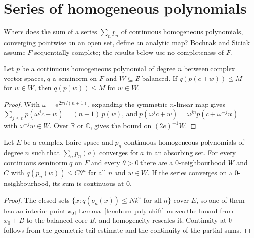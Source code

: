 \section{Series of homogeneous polynomials}

Where does the sum of a series $\sum_n p_n$ of continuous homogeneous polynomials, converging
pointwise on an open set, define an analytic map? Bochnak and Siciak \cite[\S5]{BS71b} assume
$F$ sequentially complete; the results below use no completeness of $F$.

\begin{lemma}
  \label{lem:hom-poly-shift}
  \leanok
  Let $p$ be a continuous homogeneous polynomial of degree $n$ between complex vector spaces,
  $q$ a seminorm on $F$ and $W \subseteq E$ balanced. If $q(p(c + w)) \le M$ for $w \in W$, then
  $q(p(w)) \le M$ for $w \in W$.
\end{lemma}

\begin{proof}
  \leanok
  With $\omega = e^{2\pi i/(n+1)}$, expanding the symmetric $n$-linear map gives
  $\sum_{j \le n} p(\omega^j c + w) = (n+1)\, p(w)$, and
  $p(\omega^j c + w) = \omega^{jn} p(c + \omega^{-j} w)$ with $\omega^{-j} w \in W$. Over
  $\mathbb{R}$ or $\mathbb{C}$, \cite[Lemma~2 (ii)]{BS71a} gives the bound on $(2e)^{-1} W$.
\end{proof}

\begin{proposition}
  \label{prop:bs-baire}
  \leanok
  Let $E$ be a complex Baire space and $p_n$ continuous homogeneous polynomials of degree $n$
  such that $\sum_n p_n(a)$ converges for $a$ in an absorbing set. For every continuous
  seminorm $q$ on $F$ and every $\theta > 0$ there are a $0$-neighbourhood $W$ and $C$ with
  $q(p_n(w)) \le C \theta^n$ for all $n$ and $w \in W$. If the series converges on a
  $0$-neighbourhood, its sum is continuous at $0$.
\end{proposition}

\begin{proof}
  \leanok
  The closed sets $\{x : q(p_n(x)) \le N k^n \text{ for all } n\}$ cover $E$, so one of them has
  an interior point $x_0$; Lemma~\ref{lem:hom-poly-shift} moves the bound from $x_0 + B$ to
  the balanced core $B$, and homogeneity rescales it. Continuity at $0$ follows from the
  geometric tail estimate and the continuity of the partial sums.
\end{proof}

